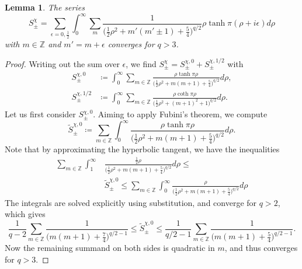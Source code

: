 \documentclass{amsart}
\newtheorem{lemma}[theorem]{Lemma}
\theoremstyle{definition}
\theoremstyle{remark}
\numberwithin{equation}{section}
\begin{document}
\begin{lemma}\label{series_3}
    The series
    \begin{equation*}
        S^\chi_\pm=\sum_{\epsilon=0,\tfrac{1}{2}}\int_0^\infty \sum_m\frac{1}{\Big(\tfrac{1}{2}\rho^2+m'(m'\pm1)+\tfrac{5}{4}\Big)^{q/2}}\rho\tanh\pi(\rho+i\epsilon)d\rho
    \end{equation*}
    with $m\in\mathbb{Z}$ and $m'=m+\epsilon$ converges for $q>3$.
\end{lemma}
\begin{proof}
    Writing out the sum over $\epsilon$, we find $S^{\chi}_\pm=S^{\chi,0}_\pm+S^{\chi,1/2}_\pm$ with
    \begin{align*}
        S^{\chi,0}_\pm&\coloneq\int_0^\infty\sum_{m\in\mathbb{Z}}\frac{\rho\tanh\pi\rho}{\Big(\tfrac{1}{2}\rho^2+m(m+1)+\tfrac{5}{4}\Big)^{q/2}}d\rho,\\
        S^{\chi,1/2}_\pm&\coloneq\int_0^\infty\sum_{m\in\mathbb{Z}}\frac{\rho\coth\pi\rho}{\Big(\tfrac{1}{2}\rho^2+(m+1)^2+1\Big)^{q/2}}d\rho.
    \end{align*}
    Let us first consider $S^{\chi,0}_\pm$. Aiming to apply Fubini's theorem, we compute
    \begin{equation*}
        \tilde{S}^{\chi,0}_\pm\coloneq\sum_{m\in\mathbb{Z}}\int_0^\infty \frac{\rho\tanh\pi\rho}{\Big(\tfrac{1}{2}\rho^2+m(m+1)+\tfrac{5}{4}\Big)^{q/2}}d\rho.
    \end{equation*}
    Note that by approximating the hyperbolic tangent, we have the inequalities
    \begin{align*}
        \sum_{m\in\mathbb{Z}}\int_1^\infty&\frac{\tfrac{1}{2}\rho}{\Big(\tfrac{1}{2}\rho^2+m(m+1)+\tfrac{5}{4}\Big)^{q/2}}d\rho\leq \\
        &\tilde{S}^{\chi,0}_\pm\leq \sum_{m\in\mathbb{Z}}\int_0^\infty \frac{\rho}{\Big(\tfrac{1}{2}\rho^2+m(m+1)+\tfrac{5}{4}\Big)^{q/2}}d\rho
    \end{align*}
    The integrals are solved explicitly using substitution, and converge for $q>2$, which gives
    \begin{equation*}
            \frac{1}{q-2}\sum_{m\in\mathbb{Z}} \frac{1}{\Big(m(m+1)+\tfrac{7}{4}\Big)^{q/2-1}}\leq \tilde{S}^{\chi,0}_\pm\leq \frac{1}{q/2-1}\sum_{m\in\mathbb{Z}} \frac{1}{\Big(m(m+1)+\tfrac{5}{4}\Big)^{q/2-1}}.
    \end{equation*}
    Now the remaining summand on both sides is quadratic in $m$, and thus converges for $q>3$.


\end{proof}
\end{document}
